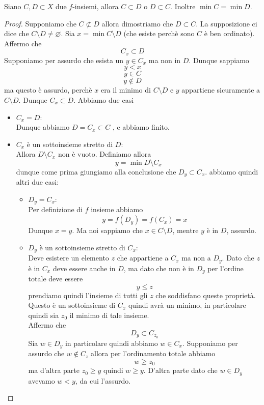 \documentclass[11pt]{scrartcl}
\newcommand{\eset}{\varnothing}
\begin{document}
  \begin{lemma}
  	Siano $C,D\subset X$ due $f$-insiemi, allora $C\subset D$ o $D\subset C$. Inoltre $\min C=\min D$.
  \end{lemma}
  \begin{proof}
  	Supponiamo che $C\not\subset D$ allora dimostriamo che $D\subset C$. La supposizione ci dice che $C\setminus D\ne \eset$. Sia $x=\min C\setminus D$ (che esiste perchè sono $C$ è ben ordinato). 
  	Affermo che
  	$$C_x\subset D$$
  	Supponiamo per assurdo che esista un $y\in C_x$ ma non in $D$. Dunque sappiamo
  	$$y<x$$
  	$$y\in C$$
  	$$y\not\in D$$
  	ma questo è assurdo, perchè $x$ era il minimo di $C\setminus D$ e $y$ appartiene sicuramente a $C\setminus D$. Dunque $C_x\subset D$. Abbiamo due casi
  	\begin{itemize}
  		\item $C_x=D$: \\
  		Dunque abbiamo $D=C_x\subset C$ , e abbiamo finito.
  		\item $C_x$ è un sottoinsieme stretto di $D$: \\
  		 Allora $D\setminus C_x$ non è vuoto. Definiamo allora
  		$$y=\min D\setminus C_x$$
  		dunque come prima giungiamo alla conclusione che $D_y\subset C_x$. abbiamo quindi altri due casi:
  		\begin{itemize}
  			\item $D_y=C_x$:\\
  			Per definizione di $f$ insieme abbiamo
  			$$y=f(D_y)=f(C_x)=x$$
  			Dunque $x=y$. Ma noi sappiamo che $x\in C\setminus D$, mentre $y$ è in $D$, assurdo.
  			\item $D_y$ è un sottoinsieme stretto di $C_x$: \\
  			Deve esistere un elemento $z$ che appartiene a $C_x$ ma non a $D_y$. Dato che $z$ è in $C_x$ deve essere anche in $D$, ma dato che non è in $D_y$ per l'ordine totale deve essere
  			$$y\le z$$
  			prendiamo quindi l'insieme di tutti gli $z$ che soddisfano queste proprietà. Questo è un sottoinsieme di $C_x$ quindi avrà un minimo, in particolare quindi sia $z_0$ il minimo di tale insieme. \\
  			Affermo che 
  			$$D_y \subset C_{z_0}$$
  			Sia $w\in D_y$ in particolare quindi abbiamo $w\in C_x$. Supponiamo per assurdo che $w\not\in C_z$ allora per l'ordinamento totale abbiamo
  			$$w\ge z_0$$
  			ma d'altra parte $z_0\ge y$ quindi $w\ge y$. D'altra parte dato che $w\in D_y$ avevamo $w<y$, da cui l'assurdo. \\

\end{itemize}
\end{itemize}
\end{proof}
\end{document}

